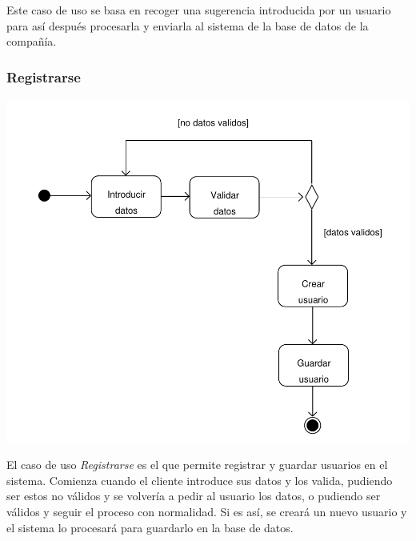 \documentclass[11pt, a4paper, twoside, titlepage]{article}
\begin{document}
				Este caso de uso se basa en recoger una sugerencia introducida por un usuario para así después procesarla y enviarla al sistema de la base de datos de la compañía.

			\subsubsection{Registrarse}
				\begin{center}
					\includegraphics[scale=.8]{analisis/diagramas/da_registrarse.pdf}
				\end{center}
				
				El caso de uso {\itshape Registrarse} es el que permite registrar y guardar usuarios en el sistema. 
				Comienza cuando el cliente introduce sus datos y los valida, pudiendo ser estos no válidos y se volvería a pedir al usuario los datos, o pudiendo ser válidos y seguir el proceso con normalidad. Si es así, se creará un nuevo usuario y el sistema lo procesará para guardarlo en la base de datos.
\end{document}
